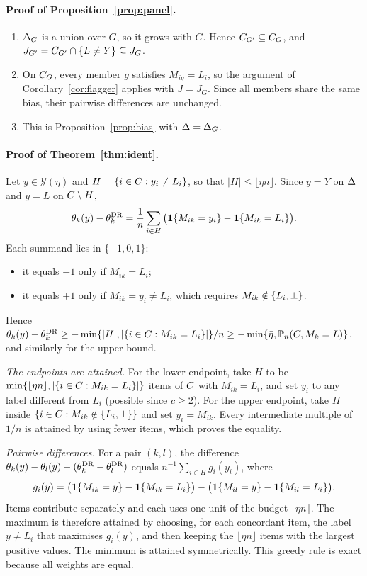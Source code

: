\paragraph{Proof of Proposition~\ref{prop:panel}.}
\begin{enumerate}
\item[(a)] $\Delta_G$ is a union over $G$, so it grows with $G$. Hence $C_{G'}\subseteq C_G$, and $J_{G'}=C_{G'}\cap\{L\ne Y\}\subseteq J_G$.
\item[(b)] On $C_G$, every member $g$ satisfies $M_{ig}=L_i$, so the argument of Corollary~\ref{cor:flagger} applies with $J=J_G$. Since all members share the same bias, their pairwise differences are unchanged.
\item[(c)] This is Proposition~\ref{prop:bias} with $\Delta=\Delta_G$. \hfill\BlackBox
\end{enumerate}

\paragraph{Proof of Theorem~\ref{thm:ident}.} Let $y\in\mathcal Y(\eta)$ and $H=\{i\in C:y_i\ne L_i\}$, so that $|H|\le\lfloor\eta n\rfloor$. Since $y=Y$ on $\Delta$ and $y=L$ on $C\setminus H$,
\[
\theta_k(y)-\theta^{\mathrm{DR}}_k=\frac1n\sum_{i\in H}\big(\mathbf{1}\{M_{ik}=y_i\}-\mathbf{1}\{M_{ik}=L_i\}\big).
\]
Each summand lies in $\{-1,0,1\}$:
\begin{itemize}
\item it equals $-1$ only if $M_{ik}=L_i$;
\item it equals $+1$ only if $M_{ik}=y_i\ne L_i$, which requires $M_{ik}\notin\{L_i,\perp\}$.
\end{itemize}
Hence $\theta_k(y)-\theta^{\mathrm{DR}}_k\ge-\min\{|H|,|\{i\in C:M_{ik}=L_i\}|\}/n\ge-\min\{\bar\eta,\mathbb{P}_n(C,M_k=L)\}$, and similarly for the upper bound.

\emph{The endpoints are attained.} For the lower endpoint, take $H$ to be $\min\{\lfloor\eta n\rfloor,|\{i\in C:M_{ik}=L_i\}|\}$ items of $C$ with $M_{ik}=L_i$, and set $y_i$ to any label different from $L_i$ (possible since $c\ge2$). For the upper endpoint, take $H$ inside $\{i\in C: M_{ik}\notin\{L_i,\perp\}\}$ and set $y_i=M_{ik}$. Every intermediate multiple of $1/n$ is attained by using fewer items, which proves the equality.

\emph{Pairwise differences.} For a pair $(k,l)$, the difference $\theta_k(y)-\theta_l(y)-(\theta_k^{\mathrm{DR}}-\theta_l^{\mathrm{DR}})$ equals $n^{-1}\sum_{i\in H}g_i(y_i)$, where
\[
g_i(y)=\big(\mathbf{1}\{M_{ik}=y\}-\mathbf{1}\{M_{ik}=L_i\}\big)-\big(\mathbf{1}\{M_{il}=y\}-\mathbf{1}\{M_{il}=L_i\}\big).
\]
Items contribute separately and each uses one unit of the budget $\lfloor\eta n\rfloor$. The maximum is therefore attained by choosing, for each concordant item, the label $y\ne L_i$ that maximises $g_i(y)$, and then keeping the $\lfloor\eta n\rfloor$ items with the largest positive values. The minimum is attained symmetrically. This greedy rule is exact because all weights are equal. \hfill\BlackBox

